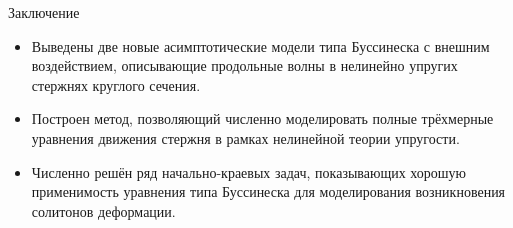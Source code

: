 \documentclass{beamer}
\begin{document}
\begin{frame}{Заключение}
\begin{itemize}
	\item Выведены две новые асимптотические модели типа Буссинеска с внешним воздействием, описывающие продольные волны в нелинейно упругих стержнях круглого сечения.
	\item Построен метод, позволяющий численно моделировать полные трёхмерные уравнения движения стержня в рамках нелинейной теории упругости.
	\item Численно решён ряд начально-краевых задач, показывающих хорошую применимость уравнения типа Буссинеска для моделирования возникновения солитонов деформации.
\end{itemize}

\end{frame}
\end{document}
